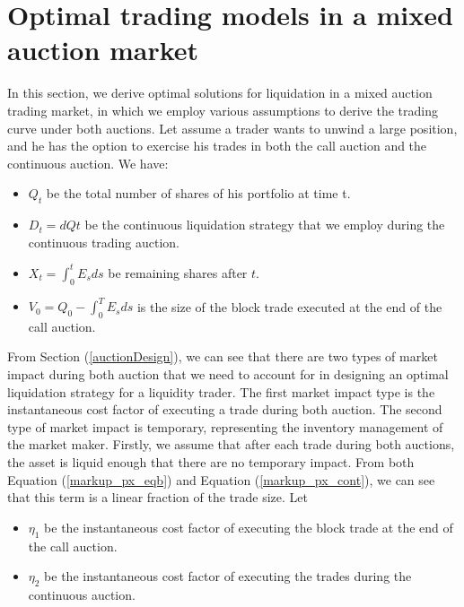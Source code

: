 \documentclass{article}
\begin{document}
\section{Optimal trading models in a mixed auction market}\label{secModel}

In this section, we derive optimal solutions for liquidation in a mixed auction trading market, in which we employ various assumptions to derive the trading curve under both auctions. Let assume a trader wants to unwind a large position, and he has the option to exercise his trades in both the call auction and the continuous auction. We have:

\begin{itemize}
  \item $Q_t$ be the total number of shares of his portfolio at time t.
  \item $D_t=dQt$ be the continuous liquidation strategy that we employ during the continuous trading auction.
  \item $X_t=\int_0^t E_s ds$ be remaining shares after $t$.
  \item $V_0=Q_0 - \int_0^T E_s ds$ is the size of the block trade executed at the end of the call auction.
\end{itemize}

From Section (\ref{auctionDesign}), we can see that there are two types of market impact during both auction that we need to account for in designing an optimal liquidation strategy for a liquidity trader. The first market impact type is the instantaneous cost factor of executing a trade during both auction. The second type of market impact is temporary, representing the inventory management of the market maker. Firstly, we assume that after each trade during both auctions, the asset is liquid enough that there are no temporary impact. From both Equation (\ref{markup_px_eqb}) and Equation (\ref{markup_px_cont}), we can see that this term is a linear fraction of the trade size. Let
\begin{itemize}
  \item $\eta_1$ be the instantaneous cost factor of executing the block trade at the end of the call auction.
  \item $\eta_2$ be the instantaneous cost factor of executing the trades during the continuous auction.
\end{itemize}
\end{document}
